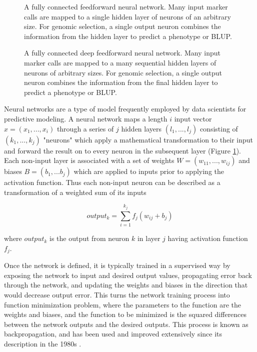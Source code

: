 \documentclass[9pt,twocolumn,twoside]{g3_article/gsag3jnl}
\begin{document}
\begin{figure}[htbp]
\renewcommand{\familydefault}{\sfdefault}\normalfont
\centering

\caption{A fully connected feedforward neural network. Many input marker calls are mapped 
to a single hidden layer of neurons of an arbitrary size. For genomic selection, a single output
neuron combines the information from the hidden layer to predict a phenotype or BLUP.}%
\label{fig:simplenet}
\end{figure}

\begin{figure}[htbp]
\renewcommand{\familydefault}{\sfdefault}\normalfont
\centering

\caption{A fully connected deep feedforward neural network. Many input marker calls are mapped 
to a many sequential hidden layers of neurons of arbitrary sizes. For genomic selection, a single output
neuron combines the information from the final hidden layer to predict a phenotype or BLUP.}%
\label{fig:deepnet}
\end{figure}


Neural networks are a type of model frequently employed by data scientists
for predictive modeling. A neural network maps a length $i$ input vector $x = (x_1, ..., x_i)$
through a series of $j$ hidden layers $(l_1, ..., l_j)$ consisting of $(k_1, ..., k_j)$ "neurons" 
which apply a mathematical transformation to their input and forward the 
result on to every neuron in the subsequent layer (Figure \ref{fig:simplenet}). 
Each non-input layer is associated with a set of weights $W = (w_{11}, ..., w_{ij})$
and biases $B = (b_1, ... b_j)$ which are applied to inputs prior to applying the
activation function. Thus each non-input neuron can be described as a transformation
of a weighted sum of its inputs

\begin{equation}
    output_k = \sum_{i=1}^{k_{j}} f_j(w_{ij} + b_j)
\label{eq:neuron}
\end{equation}

where $output_k$ is the output from neuron $k$ in layer $j$ having activation
function $f_j$. 

Once the network is defined, it is typically trained in a supervised way by 
exposing the network to input and desired output values, propagating error 
back through the network, and updating the weights and biases in the direction that would
decrease output error. This turns the network training process into 
function minimization problem, where the parameters to the function are the
weights and biases, and the function to be minimized is the squared differences
between the network outputs and the desired outputs. This process is 
known as backpropagation, and has been used and improved
extensively since its description in the 1980s \citep{rumelhart1986}. 
\end{document}
